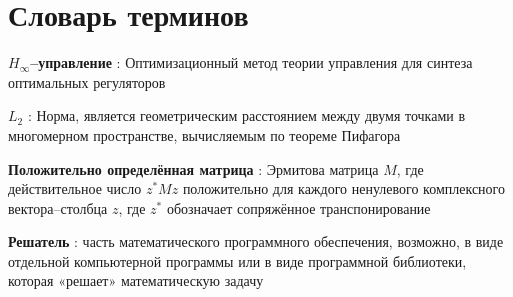 \chapter*{Словарь терминов}             %

\textbf{\(H_\infty\)--управление } : Оптимизационный метод теории управления для синтеза оптимальных регуляторов

\textbf{\(L_2\)} : Норма, является геометрическим расстоянием между двумя точками в многомерном пространстве, вычисляемым по теореме Пифагора

\textbf{Положительно определённая матрица} : Эрмитова матрица $M$, где действительное число $z^* M z$ положительно для каждого ненулевого комплексного вектора--столбца $z$, где $z^*$ обозначает сопряжённое транспонирование

\textbf{Решатель} : часть математического программного обеспечения, возможно, в виде отдельной компьютерной программы или в виде программной библиотеки, которая «решает» математическую задачу